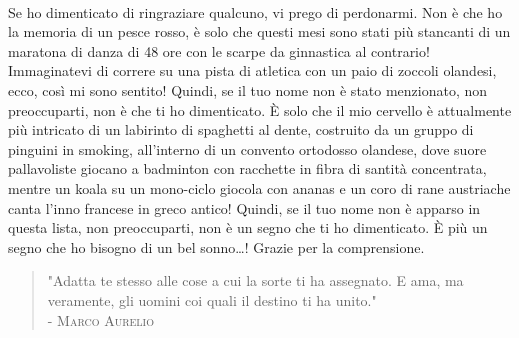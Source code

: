 \begin{flushright}
    \\
    Se ho dimenticato di ringraziare qualcuno, vi prego di perdonarmi. Non è che ho la memoria di un pesce rosso, è solo che questi mesi sono stati più stancanti di un maratona di danza di 48 ore con le scarpe da ginnastica al contrario! Immaginatevi di correre su una pista di atletica con un paio di zoccoli olandesi, ecco, così mi sono sentito! Quindi, se il tuo nome non è stato menzionato, non preoccuparti, non è che ti ho dimenticato. È solo che il mio cervello è attualmente più intricato di un labirinto di spaghetti al dente, costruito da un gruppo di pinguini in smoking, all’interno di un convento ortodosso olandese, dove suore pallavoliste giocano a badminton con racchette in fibra di santità concentrata, mentre un koala su un mono-ciclo giocola con ananas e un coro di rane austriache canta l’inno francese in greco antico! Quindi, se il tuo nome non è apparso in questa lista, non preoccuparti, non è un segno che ti ho dimenticato. È più un segno che ho bisogno di un bel sonno\dots! Grazie per la comprensione.
    \\
    \upshape %
\end{flushright}

\begin{quote}
\centering
    "Adatta te stesso alle cose a cui la sorte ti ha assegnato. E ama, ma veramente, gli uomini coi quali il destino ti ha unito."\\
    \textsc{- Marco Aurelio}
\end{quote}
\cleardoublepage